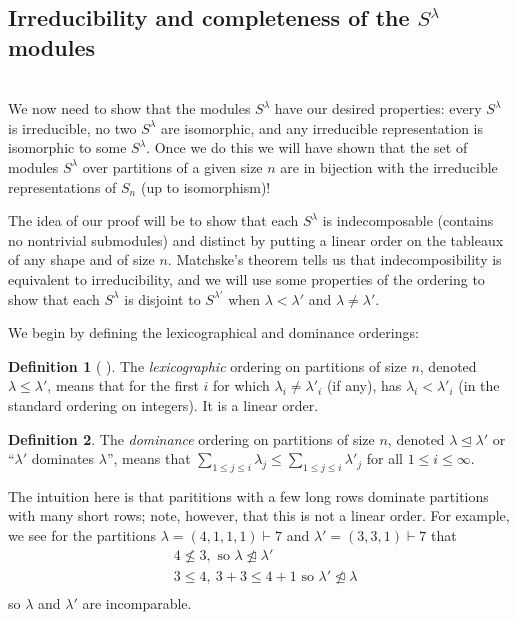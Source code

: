\documentclass[12pt,twoside]{reedthesis}
\theoremstyle{plain}   %
\theoremstyle{definition}
\newtheorem{defn}{Definition}[section]
\theoremstyle{remark}
\numberwithin{equation}{section}
\def\normeq{\trianglelefteq}
\begin{document}
  \subsection{Irreducibility and completeness of the $S^\lambda$ modules} \hfill\\
  We now need to show that the modules $S^\lambda$ have our desired properties: every $S^\lambda$ is irreducible, no two $S^\lambda$ are isomorphic,
  and any irreducible representation is isomorphic to some $S^\lambda$. Once we do this we will have shown that the set of modules $S^\lambda$
  over partitions of a given size $n$
  are in bijection with the irreducible representations of $S_n$ (up to isomorphism)! \par
  The idea of our proof will be to show that each $S^\lambda$ is indecomposable (contains no nontrivial submodules)
  and distinct by putting a linear order on the tableaux of any shape
  and of size $n$. Matchske's theorem tells us that indecomposibility is equivalent to irreducibility, and we will use some properties of the ordering
  to show that each $S^\lambda$ is disjoint to $S^{\lambda'}$ when $\lambda < \lambda'$ and $\lambda \neq \lambda'$.
  \par
  We begin by defining the lexicographical and dominance orderings:
  \begin{defn}[ {\cite[pg. 36]{fulton}} ]
    The \emph{lexicographic} ordering on partitions of size $n$, denoted $ \lambda \leq \lambda'$, means that
    for the first $i$ for which $\lambda_i \neq \lambda'_i$ (if any), has $\lambda_i < \lambda'_i$ (in the standard ordering on integers).
    It is a linear order.
  \end{defn}
  \begin{defn}
    The \emph{dominance} ordering on partitions of size $n$, denoted $ \lambda \normeq \lambda'$ or ``$\lambda'$ dominates $\lambda$'',
    means that $\sum_{1 \leq j \leq i} \lambda_j \leq \sum_{1 \leq j \leq i} \lambda'_j$ for all $ 1 \leq i \leq \infty$. \par
    The intuition here is that parititions with a few long rows dominate partitions with many short rows; note, however, that this is
    not a linear order. For example, we see for the partitions $\lambda = (4,1,1,1) \vdash 7$ and $\lambda' = (3,3,1) \vdash 7$ that
    \begin{align*}
      &4 \not \leq 3, \text{ so $\lambda \not \normeq \lambda'$}\\
      &3 \leq  4, \ 3 + 3 \leq 4 + 1  \text{ so $\lambda' \not \normeq \lambda$}\\
    \end{align*}
    so $\lambda$ and $\lambda'$ are incomparable.
  \end{defn}
\end{document}
